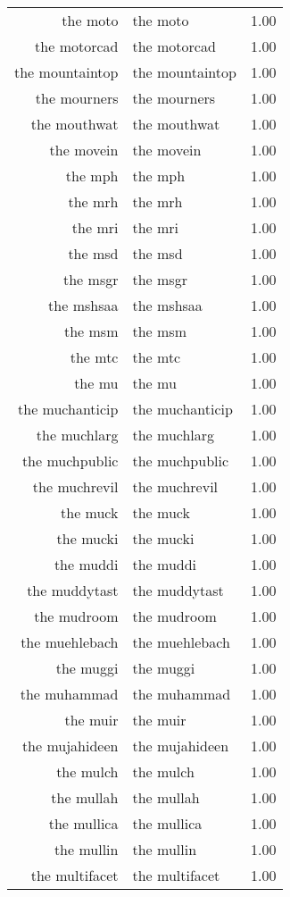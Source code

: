 \begin{table}[ht]
\begin{tabular}{rlr}
  the moto & the moto & 1.00 \\ 
  the motorcad & the motorcad & 1.00 \\ 
  the mountaintop & the mountaintop & 1.00 \\ 
  the mourners & the mourners & 1.00 \\ 
  the mouthwat & the mouthwat & 1.00 \\ 
  the movein & the movein & 1.00 \\ 
  the mph & the mph & 1.00 \\ 
  the mrh & the mrh & 1.00 \\ 
  the mri & the mri & 1.00 \\ 
  the msd & the msd & 1.00 \\ 
  the msgr & the msgr & 1.00 \\ 
  the mshsaa & the mshsaa & 1.00 \\ 
  the msm & the msm & 1.00 \\ 
  the mtc & the mtc & 1.00 \\ 
  the mu & the mu & 1.00 \\ 
  the muchanticip & the muchanticip & 1.00 \\ 
  the muchlarg & the muchlarg & 1.00 \\ 
  the muchpublic & the muchpublic & 1.00 \\ 
  the muchrevil & the muchrevil & 1.00 \\ 
  the muck & the muck & 1.00 \\ 
  the mucki & the mucki & 1.00 \\ 
  the muddi & the muddi & 1.00 \\ 
  the muddytast & the muddytast & 1.00 \\ 
  the mudroom & the mudroom & 1.00 \\ 
  the muehlebach & the muehlebach & 1.00 \\ 
  the muggi & the muggi & 1.00 \\ 
  the muhammad & the muhammad & 1.00 \\ 
  the muir & the muir & 1.00 \\ 
  the mujahideen & the mujahideen & 1.00 \\ 
  the mulch & the mulch & 1.00 \\ 
  the mullah & the mullah & 1.00 \\ 
  the mullica & the mullica & 1.00 \\ 
  the mullin & the mullin & 1.00 \\ 
  the multifacet & the multifacet & 1.00 \\ 

\end{tabular}
\end{table}
